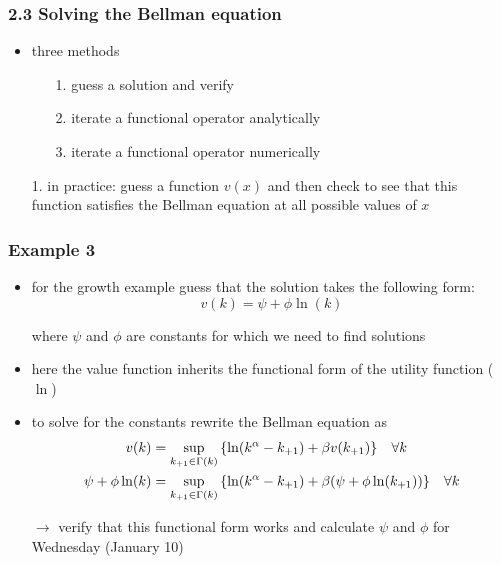 \documentclass[compress,aspectratio=169]{beamer}
\begin{document}
\begin{frame}
\frametitle{2.3 Solving the Bellman equation}
\begin{itemize}
\item three methods
\vspace{3 mm}
	\begin{itemize}
	\item[1.] guess a solution and verify
	\vspace{3 mm}
	\item[2.] iterate a functional operator analytically
	\vspace{3 mm}
	\item[3.] iterate a functional operator numerically
	\vspace{3 mm}
	\end{itemize}
\vspace{3 mm}
\item[1.] in practice: guess a function $v(x)$ and then check to see that this function satisfies the Bellman equation at all possible values of $x$
\end{itemize}
\end{frame}

\begin{frame}
\frametitle{Example 3}
\begin{itemize}
\item for the growth example guess that the solution takes the following form:
\begin{displaymath}
v(k)=\psi+\phi \ln(k)
\end{displaymath}
\item[] where $\psi$ and $\phi$ are constants for which we need to find solutions
\item here the value function inherits the functional form of the utility function ($\ln$)
\item to solve for the constants rewrite the Bellman equation as
\begin{align*}
v(k) & = \sup_{k_{+1}\in\Gamma(k)} \left\{ \ln(k^\alpha-k_{+1})+\beta v(k_{+1})\right\} \hspace{3 mm} \forall k \\
\psi+\phi \ln(k) & = \sup_{k_{+1}\in\Gamma(k)} \left\{ \ln(k^\alpha-k_{+1})+\beta (\psi+\phi \ln(k_{+1}))\right\} \hspace{3 mm} \forall k
\end{align*}
\item[$\rightarrow$] verify that this functional form works and calculate $\psi$ and $\phi$ for Wednesday (January 10)
\end{itemize}
\end{frame}
\end{document}

